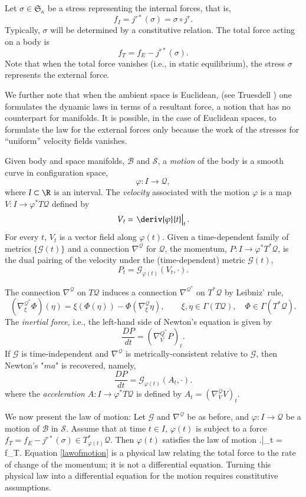 \documentclass[smallextended]{svjour3}
\begin{document}
Let $\sigma\in \mathfrak{S}_\kappa$ be a stress representing the internal forces, that is,
\[
f_I=j^{r*}(\sigma)=\sigma\circ j^r.
\]
Typically, $\sigma$ will be determined by a constitutive relation. The total force acting on a body is
\[
f_T=f_E-j^{r*}(\sigma).
\]
Note that when the total force vanishes (i.e., in static equilibrium), 
the stress $\sigma$ represents the external force.

We further note that when the ambient space is Euclidean, (see Truesdell \cite{Tru91})  one formulates the dynamic laws in terms of a resultant force, a notion that has no counterpart for manifolds. 
It is possible, in the case of Euclidean spaces, to formulate the law for the external forces only because the work of the stresses for ``uniform'' velocity fields vanishes.

Given body and space manifolds, ${\mathcal{B}}$ and ${\mathcal{S}}$,
a \emph{motion} of the body is a smooth curve in configuration space,
\[
{\varphi}:I\to {\mathcal{Q}},
\]
where $I\subset\R$ is an interval. 
The \emph{velocity} associated with the motion ${\varphi}$ is a map $V:I\to {\varphi}^*T{\mathcal{Q}}$ defined by
\[
V_t=\left.\deriv{\varphi}{t}\right|_t.
\]
For every $t$, $V_t$ is a vector field along ${\varphi}(t)$. 
Given a time-dependent family of metrics $\{{\mathcal{G}}(t)\}$ and a connection $\nabla^{\mathcal{Q}}$ for ${\mathcal{Q}}$, the momentum, $P:I\to {\varphi}^*T^*{\mathcal{Q}}$, is the dual pairing of the velocity under the (time-dependent) metric ${\mathcal{G}}(t)$, 
\[
P_t={\mathcal{G}}_{{\varphi}(t)}(V_t,\cdot).
\]

The connection $\nabla^{\mathcal{Q}}$ on $T{\mathcal{Q}}$ induces a connection $\nabla^{{\mathcal{Q}}^*}$ on $T^*{\mathcal{Q}}$ by Leibniz' rule,
\[
(\nabla^{{\mathcal{Q}}^*}_\xi\Phi)(\eta) = \xi(\Phi(\eta)) - \Phi(\nabla^{\mathcal{Q}}_\xi\eta),
\qquad
\xi,\eta\in\Gamma(T{\mathcal{Q}}), 
\quad
\Phi\in\Gamma(T^*{\mathcal{Q}}).
\]
The \emph{inertial force}, i.e., the left-hand side of Newton's equation is given by
\[
\frac{DP}{dt}=(\nabla^{Q^*}_V P)_t.
\]
If ${\mathcal{G}}$ is time-independent and $\nabla^{\mathcal{Q}}$ is metrically-consistent relative to ${\mathcal{G}}$, then Newton's "$ma$" is recovered, namely,
\[
\frac{DP}{dt}= {\mathcal{G}}_{{\varphi}(t)}(A_t,\cdot) .
\]
where the \emph{acceleration} $A:I\to{\varphi}^*T{\mathcal{Q}}$ is defined by $A_t=(\nabla^{\mathcal{Q}}_VV)_t$.

We now present the law of motion:
Let ${\mathcal{G}}$ and $\nabla^{\mathcal{Q}}$ be as before, and ${\varphi}:I\to{\mathcal{Q}}$ be a motion of ${\mathcal{B}}$ in ${\mathcal{S}}$. Assume that at  time $t\in I$, ${\varphi}(t)$ is subject to a force $f_T=f_E-j^{r*}(\sigma)\in T^*_{{\varphi}(t)}{\mathcal{Q}}$. Then ${\varphi}(t)$ satisfies
the law of motion
\beq\label{lawofmotion}
\left.\right|_t = f_T.
\eeq
Equation \eqref{lawofmotion} is a physical law relating the total force to the rate of change of the momentum; it is not a differential equation. Turning this physical law into a differential equation for the motion requires constitutive assumptions.
\end{document}
